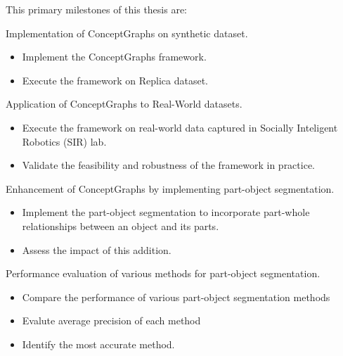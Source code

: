 This primary milestones of this thesis are:
\begin{compactenum}[1.]
\item	Implementation of ConceptGraphs on synthetic dataset.
\begin{itemize}
    \item Implement the ConceptGraphs framework.
    \item Execute the framework on Replica dataset.
\end{itemize}
\item	Application of ConceptGraphs to Real-World datasets.
\begin{itemize}
    \item Execute the framework on real-world data captured in Socially Inteligent Robotics (SIR) lab.
    \item Validate the feasibility and robustness of the framework in practice.
\end{itemize}
\item	Enhancement of ConceptGraphs by implementing part-object segmentation.
\begin{itemize}
    \item Implement the part-object segmentation to incorporate part-whole relationships between an object and its parts.
    \item Assess the impact of this addition.
\end{itemize}
\item	Performance evaluation of various methods for part-object segmentation.
\begin{itemize}
    \item Compare the performance of various part-object segmentation methods
    \item Evalute average precision of each method
    \item Identify the most accurate method.
\end{itemize}
\end{compactenum}
